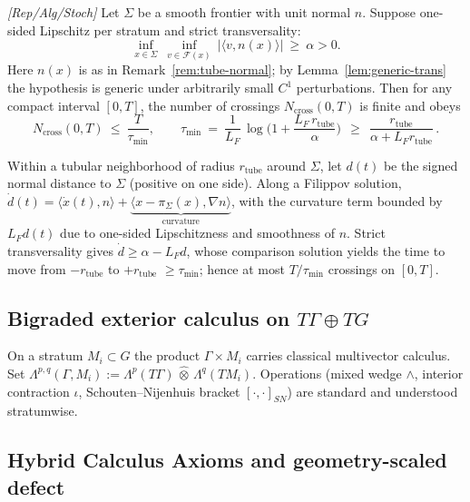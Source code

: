 \begin{lemma}\label{lem:no-zeno}
\emph{[\textup{Rep/Alg/Stoch}]} Let $\Sigma$ be a smooth frontier with unit normal $n$. Suppose one-sided Lipschitz per stratum and strict transversality:
\[
\inf_{x\in\Sigma}\ \inf_{v\in \mathcal F(x)}\ |\langle v,n(x)\rangle|\ \ge\ \alpha>0.
\]
Here $n(x)$ is as in Remark~\ref{rem:tube-normal}; by Lemma~\ref{lem:generic-trans} the hypothesis is generic under arbitrarily small $C^1$ perturbations. Then for any compact interval $[0,T]$, the number of crossings $N_{\mathrm{cross}}(0,T)$ is finite and obeys
\[
N_{\mathrm{cross}}(0,T)\ \le\ \frac{T}{\tau_{\min}},\qquad
\tau_{\min}\ =\ \frac{1}{L_F}\,\log\!\Big(1+\frac{L_F\,r_{\mathrm{tube}}}{\alpha}\Big)\ \ \ge\ \ \frac{r_{\mathrm{tube}}}{\alpha+L_F r_{\mathrm{tube}}}\,.
\]
\begin{proofsketch}
Within a tubular neighborhood of radius $r_{\mathrm{tube}}$ around $\Sigma$, let $d(t)$ be the signed normal distance to $\Sigma$ (positive on one side). Along a Filippov solution, $\dot d(t)=\langle \dot x(t),n\rangle+\underbrace{\langle x-\pi_\Sigma(x),\nabla n\rangle}_{\text{curvature}}$, with the curvature term bounded by $L_F d(t)$ due to one-sided Lipschitzness and smoothness of $n$. Strict transversality gives $\dot d\ge \alpha - L_F d$, whose comparison solution yields the time to move from $-r_{\mathrm{tube}}$ to $+r_{\mathrm{tube}}$ $\ge \tau_{\min}$; hence at most $T/\tau_{\min}$ crossings on $[0,T]$.
\end{proofsketch}
\end{lemma}

\subsection{Bigraded exterior calculus on $T\Gamma\oplus TG$}

On a stratum $M_i\subset G$ the product $\Gamma\times M_i$ carries classical multivector calculus. Set
$\Lambda^{p,q}(\Gamma,M_i):=\Lambda^p(T\Gamma)\,\hat\otimes\,\Lambda^q(TM_i)$. Operations (mixed wedge $\wedge$, interior contraction $\iota$, Schouten--Nijenhuis bracket $[\cdot,\cdot]_{SN}$) are standard and understood stratumwise.

\subsection{Hybrid Calculus Axioms and geometry-scaled defect}\label{subsec:hybrid-axioms}

